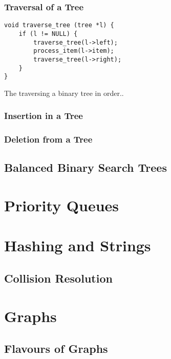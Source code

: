 \subsubsection{Traversal of a Tree}
		\citet{Boole54}
\begin{listing}[h]
	\begin{verbatim}
void traverse_tree (tree *l) {
	if (l != NULL) {
		traverse_tree(l->left);
		process_item(l->item);
		traverse_tree(l->right);
	}
}
	\end{verbatim}
	\caption{\label{code:inordertraversal} The traversing a binary tree in order..}
\end{listing}
			\subsubsection{Insertion in a Tree}
			\subsubsection{Deletion from a Tree}
		\subsection{Balanced Binary Search Trees}
\section{Priority Queues}
\section{Hashing and Strings}
	\subsection{Collision Resolution}
		
\section{Graphs}
	\subsection{Flavours of Graphs}
